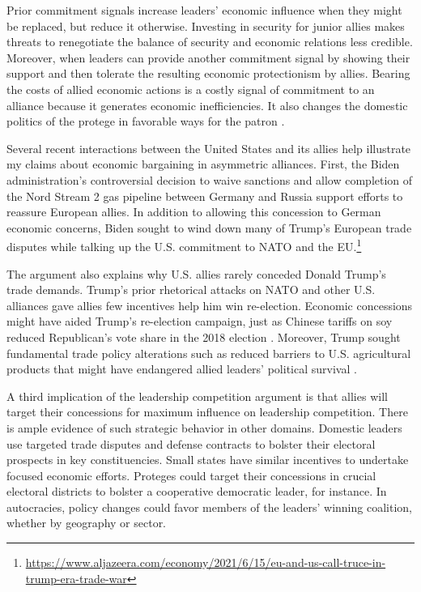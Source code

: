 \documentclass[12pt]{article}
\begin{document}
Prior commitment signals increase leaders' economic influence when they might be replaced, but reduce it otherwise. 
Investing in security for junior allies makes threats to renegotiate the balance of security and economic relations less credible. 
Moreover, when leaders can provide another commitment signal by showing their support and then tolerate the resulting economic protectionism by allies. 
Bearing the costs of allied economic actions is a costly signal of commitment to an alliance because it generates economic inefficiencies. 
It also changes the domestic politics of the protege in favorable ways for the patron \citep{Lake2013}. 


Several recent interactions between the United States and its allies help illustrate my claims about economic bargaining in asymmetric alliances. 
First, the Biden administration's controversial decision to waive sanctions and allow completion of the Nord Stream 2 gas pipeline between Germany and Russia support efforts to reassure European allies. 
In addition to allowing this concession to German economic concerns, Biden sought to wind down many of Trump's European trade disputes while talking up the U.S. commitment to NATO and the EU.\footnote{\url{https://www.aljazeera.com/economy/2021/6/15/eu-and-us-call-truce-in-trump-era-trade-war}}


The argument also explains why U.S. allies rarely conceded Donald Trump's trade demands. 
Trump's prior rhetorical attacks on NATO and other U.S. alliances gave allies few incentives help him win re-election. 
Economic concessions might have aided Trump's re-election campaign, just as Chinese tariffs on soy reduced Republican's vote share in the 2018 election \citep{ChyzhUrbatsch2021}. 
Moreover, Trump sought fundamental trade policy alterations such as reduced barriers to U.S. agricultural products that might have endangered allied leaders' political survival \citep{HeeParkJensen2007}.



A third implication of the leadership competition argument is that allies will target their concessions for maximum influence on leadership competition. 
There is ample evidence of such strategic behavior in other domains.
Domestic leaders use targeted trade disputes \citep{Conconietal2017} and defense contracts \citep{DerouenHeo2000} to bolster their electoral prospects in key constituencies.  
Small states have similar incentives to undertake focused economic efforts.
Proteges could target their concessions in crucial electoral districts to bolster a cooperative democratic leader, for instance. 
In autocracies, policy changes could favor members of the leaders' winning coalition, whether by geography or sector.
\end{document}
